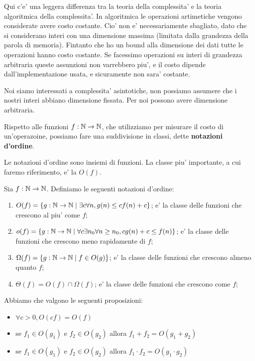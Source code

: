 Qui c'e' una leggera differenza tra la teoria della complessita' e la teoria algoritmica della
complessita'. In algoritmica le operazioni artimetiche vengono considerate avere costo costante.
Cio' non e' necessariamente sbagliato, dato che si considerano interi con una dimensione massima
(limitata dalla grandezza della parola di memoria). Fintanto che ho un bound alla dimensione dei
dati tutte le operazioni hanno costo costante. Se facessimo operazioni su interi di grandezza
arbitraria queste assunzioni non varrebbero piu', e il costo dipende dall'implementazione usata, e
sicuramente non sara' costante.

Noi siamo interessati a complessita' asintotiche, non possiamo assumere che i nostri interi abbiano
dimensione fissata. Per noi possono avere dimensione arbitraria.

Rispetto alle funzioni $f:\mathbb{N} \to \mathbb{N}$, che utilizziamo per misurare il costo di un'operazoine,
possiamo fare una suddivisione in classi, dette \textbf{notazioni d'ordine}.

Le notazioni d'ordine sono insiemi di funzioni. La classe piu' importante, a cui faremo riferimento,
e' la $O(f)$.

\begin{defn}
    Sia $f: \mathbb{N} \to \mathbb{N}$. Definiamo le seguenti notazioni d'ordine:
    \begin{enumerate}
        \item $O(f) = \{g:\mathbb{N} \to \mathbb{N} \mid \exists c \forall n, g(n) \leq c f(n) + c\}$; e' la
        classe delle funzioni che crescono al piu' come $f$;
        \item $o(f) = \{g:\mathbb{N} \to \mathbb{N} \mid \forall c \exists n_{0} \forall n \geq n_{0}, c g(n)
        + c \leq f(n)\}$; e' la classe delle funzioni che crescono meno rapidamente di $f$;
        \item $\Omega(f) = \{g:\mathbb{N} \to \mathbb{N} \mid f \in O(g)\}$; e' la classe delle funzioni che
        crescono almeno quanto $f$;
        \item $\Theta(f) = O(f) \cap \Omega(f)$; e' la classe delle funzioni che crescono come $f$;
    \end{enumerate}
\end{defn}

Abbiamo che valgono le seguenti proposizioni:
\begin{itemize}
    \item $\forall c > 0, O(cf) = O(f)$ 
    \item se $f_{1} \in O(g_{1})$ e $f_{2} \in O(g_{2})$ allora $f_{1} + f_{2} = O(g_{1} + g_{2})$
    \item se $f_{1} \in O(g_{1})$ e $f_{2} \in O(g_{2})$ allora $f_{1}\cdot f_{2} = O(g_{1} \cdot g_{2})$
\end{itemize}

